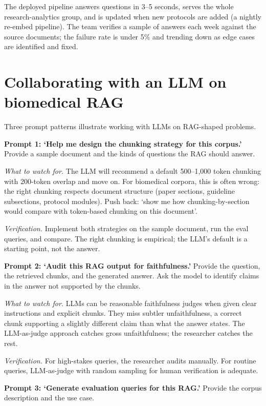 \documentclass[
  letterpaper,
  11pt]{scrbook}
\begin{document}
The deployed pipeline answers questions in 3--5 seconds, serves the
whole research-analytics group, and is updated when new protocols are
added (a nightly re-embed pipeline). The team verifies a sample of
answers each week against the source documents; the failure rate is
under 5\% and trending down as edge cases are identified and fixed.

\section{Collaborating with an LLM on biomedical
RAG}\label{collaborating-with-an-llm-on-biomedical-rag}

Three prompt patterns illustrate working with LLMs on RAG-shaped
problems.

\textbf{Prompt 1: `Help me design the chunking strategy for this
corpus.'} Provide a sample document and the kinds of questions the RAG
should answer.

\emph{What to watch for.} The LLM will recommend a default 500--1,000
token chunking with 200-token overlap and move on. For biomedical
corpora, this is often wrong: the right chunking respects document
structure (paper sections, guideline subsections, protocol modules).
Push back: `show me how chunking-by-section would compare with
token-based chunking on this document'.

\emph{Verification.} Implement both strategies on the sample document,
run the eval queries, and compare. The right chunking is empirical; the
LLM's default is a starting point, not the answer.

\textbf{Prompt 2: `Audit this RAG output for faithfulness.'} Provide the
question, the retrieved chunks, and the generated answer. Ask the model
to identify claims in the answer not supported by the chunks.

\emph{What to watch for.} LLMs can be reasonable faithfulness judges
when given clear instructions and explicit chunks. They miss subtler
unfaithfulness, a correct chunk supporting a slightly different claim
than what the answer states. The LLM-as-judge approach catches gross
unfaithfulness; the researcher catches the rest.

\emph{Verification.} For high-stakes queries, the researcher audits
manually. For routine queries, LLM-as-judge with random sampling for
human verification is adequate.

\textbf{Prompt 3: `Generate evaluation queries for this RAG.'} Provide
the corpus description and the use case.
\end{document}
